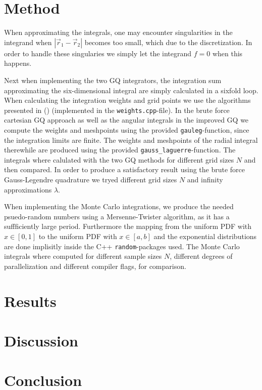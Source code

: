 \documentclass[twocolumn]{aastex62}
\begin{document}
\section{Method} \label{sec:method}
When approximating the integrals, one may encounter singularities in the integrand when $|\vec{r}_1 - \vec{r}_2|$ becomes too small, which due to the discretization. In order to handle these singularies we simply let the integrand $f=0$ when this happens.

Next when implementing the two GQ integrators, the integration sum approximating the six-dimensional integral are simply calculated in a sixfold loop. When calculating the integration weights and grid points we use the algorithms presented in (\cite{press:2007}) (implemented in the \texttt{weights.cpp}-file). In the brute force cartesian GQ approach as well as the angular integrals in the improved GQ we compute the weights and meshpoints using the provided \texttt{gauleg}-function, since the integration limits are finite. The weights and meshpoints of the radial integral therewhile are produced using the provided \texttt{gauss\_laguerre}-function.
The integrals where calulated with the two GQ methods for different grid sizes $N$ and then compared. In order to produce a satisfactory result using the brute force Gauss-Legendre quadrature we tryed different grid sizes $N$ and infinity approximations $\lambda$.

When implementing the Monte Carlo integrations, we produce the needed psuedo-random numbers using a Mersenne-Twister algorithm, as it has a suffficiently large period. Furthermore the mapping from the uniform PDF with $x\in[0,1]$ to the uniform PDF with $x\in[a,b]$ and the exponential distributions are done implisitly inside the C++ \texttt{random}-packages used. The Monte Carlo integrals where computed for different sample sizes $N$, different degrees of parallelization and different compiler flags, for comparison. 

\section{Results} \label{sec:results}
\section{Discussion} \label{sec:discussion}
\section{Conclusion} \label{sec:conclusion}

\nocite{jensen:2019}


\end{document}
